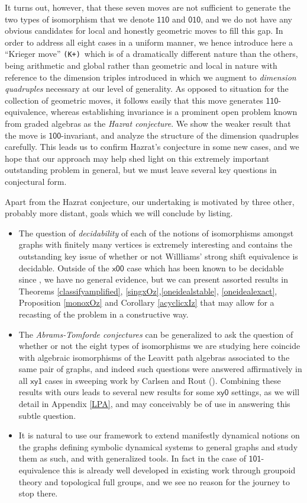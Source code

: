 \documentclass[12pt]{amsbook}%
\theoremstyle{defin}
\theoremstyle{remark}
\numberwithin{equation}{chapter}
\numberwithin{theor}{section}
\newcommand{\xyz}[1]{\mbox{$\mathsf{#1}$}}
\newcommand{\KKKp}{\mbox{\texttt{\textup{(K+)}}}}
\begin{document}
It turns out, however, that these seven moves are not sufficient to generate the two types of isomorphism that we denote \xyz{110} and \xyz{010}, and we do not have any obvious candidates for local and honestly geometric moves to fill this gap.
In order to address all eight cases in a uniform manner, we hence introduce here a ``Krieger move'' \KKKp\ which is of a dramatically different nature than the others, being arithmetic and global rather than geometric and local in nature with reference to the dimension triples introduced in \cite{wk:dftmc} which we augment to \emph{dimension quadruples} necessary at our level of generality. As opposed to situation for the collection of geometric moves, it follows easily that this move generates \xyz{110}-equivalence, whereas establishing invariance is a prominent open problem known from graded algebras as the \emph{Hazrat conjecture}. We show the weaker result that the move is  \xyz{100}-invariant, and analyze the structure of the dimension quadruples carefully. This leads us to confirm Hazrat's conjecture in some new cases, and we hope that our approach may help shed light on this extremely important outstanding problem in general, but we must leave several key questions in conjectural form. 




Apart from the Hazrat conjecture, our undertaking  is motivated by three other, probably more distant, goals which we will conclude by listing.
\begin{itemize}
\item
The question of \emph{decidability} of each of the notions of isomorphisms amongst graphs with finitely many vertices is extremely interesting and contains the outstanding key issue of whether or not Willliams' strong shift equivalence is decidable. Outside of the \xyz{x00} case which has been known to be decidable since  \cite{segrerapws:ccuggs}, we  have no general evidence,  but  we can present assorted results in Theorems  \ref{classifyamplified}, \ref{singxOz},\ref{oneidealstable}, \ref{oneidealexact}, Proposition \ref{monoxOz} and Corollary \ref{acyclicxIz} that may allow for a recasting of the problem in a constructive way.
\item  The \emph{Abrams-Tomforde conjectures} can be generalized to ask the question of whether or not the eight types of isomorphisms we are studying here coincide with algebraic isomorphisms of the Leavitt path algebras associated to the same pair of graphs, and indeed such questions were answered affirmatively in all \xyz{xy1} cases in sweeping work by Carlsen and Rout (\cite{tmcjr:dpgisa}). Combining these results with ours leads to several new results for some \xyz{xy0} settings, as we will detail in Appendix \ref{LPA}, and may conceivably be of use in answering this subtle question.
\item  It is natural to use our framework to extend manifestly dynamical notions on the graphs defining symbolic dynamical systems to general graphs and study them as such, and with generalized tools. In fact in the case of \xyz{101}-equivalence this is already well  developed in existing work through groupoid theory and topological full groups, and we see no reason for the journey to stop there.
\end{itemize}
\end{document}
